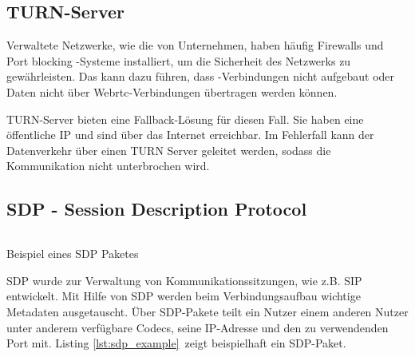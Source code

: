 %
%

\subsection{TURN-Server}

Verwaltete Netzwerke, wie die von Unternehmen, haben häufig Firewalls und Port blocking -Systeme installiert, um die Sicherheit des Netzwerks zu gewährleisten. Das kann dazu führen, dass \webrtc-Verbindungen nicht aufgebaut oder Daten nicht über Webrtc-Verbindungen übertragen werden können.

TURN-Server bieten eine Fallback-Lösung für diesen Fall. Sie haben eine öffentliche IP und sind über das Internet erreichbar. Im Fehlerfall kann der Datenverkehr über einen TURN Server geleitet werden, sodass die Kommunikation nicht unterbrochen wird.

\subsection{SDP - Session Description Protocol}
\begin{listing}[h]
	\inputminted{javascript}{listings/sdp_example.txt}
	\caption{Beispiel eines SDP Paketes}
	\label{lst:sdp_example}
\end{listing}
SDP\cite{sdp-standard} wurde zur Verwaltung von Kommunikationssitzungen, wie z.B. SIP entwickelt. Mit Hilfe von SDP werden beim Verbindungsaufbau wichtige Metadaten ausgetauscht. Über SDP-Pakete teilt ein Nutzer einem anderen Nutzer unter anderem verfügbare Codecs, seine IP-Adresse und den zu verwendenden Port mit. Listing \ref{lst:sdp_example} zeigt beispielhaft ein SDP-Paket.



